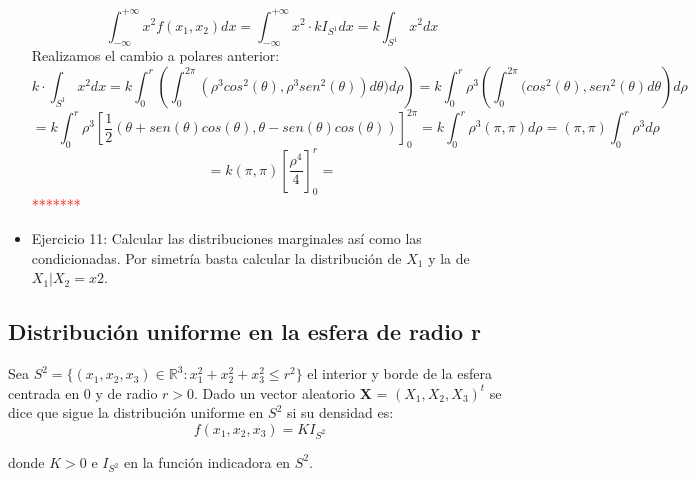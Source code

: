 \documentclass{article}
\theoremstyle{theorem-style}  %
\theoremstyle{definition}
\theoremstyle{example-style}
\begin{document}
\begin{itemize}
		$$\int_{-\infty}^{+\infty}x^2f(x_1,x_2)dx = \int_{-\infty}^{+\infty}x^2\cdot kI_{S^1}dx = k\int_{S^1}x^2dx$$
		Realizamos el cambio a polares anterior:
		$$k\cdot \int_{S^1}x^2dx = k \int_{0}^{r}\left(\int_{0}^{2\pi}(\rho^3cos^2(\theta),\rho^3sen^2(\theta))d\theta)d\rho\right) = k \int_{0}^{r}\rho^3\left(\int_0^{2\pi}(cos^2(\theta),sen^2(\theta)d\theta\right)d\rho$$
		$$=k \int_{0}^{r}\rho^3\left[\frac{1}{2}\left(\theta+sen(\theta)cos(\theta),\theta-sen(\theta)cos(\theta)\right)\right]^{2\pi}_{0} =k\int_{0}^{r}\rho^3(\pi,\pi)d\rho = (\pi,\pi)\int_{0}^{r}\rho^3 d\rho$$
		$$=k(\pi,\pi)\left[\frac{\rho^4}{4}\right]^r_0 = $$
		\textcolor{red}{*******}
		
		
		\item Ejercicio 11: Calcular las distribuciones marginales así como las condicionadas. Por simetría basta calcular la distribución de $X_1$  y la de $X_1|X_2=x2$. 
		
		 
	\end{itemize} 
	
	
	\subsection{Distribución uniforme en la esfera de radio r}
	
	Sea $S^2=\{(x_1, x_2, x_3) \in  \mathbb{R}^3: x_1^2 + x_2^2+x_3^2\leq r^2\}$ el interior y borde de la esfera centrada en 0 y de radio $r>0$. Dado un vector aleatorio \textbf{X} = $(X_1, X_2, X_3)^t$ se dice que sigue la distribución uniforme en $S^2$ si su densidad es:
	$$ f(x_1, x_2, x_3)= KI_{S^2}$$
	
	donde $K>0$ e $I_{S^2}$ en la función indicadora en $S^2$. 
	
\end{document}
